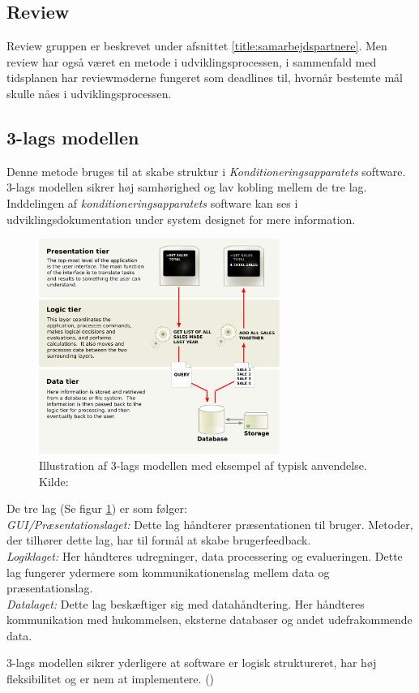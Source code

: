\subsection{Review}
Review gruppen er beskrevet under afsnittet \ref{title:samarbejdspartnere}. Men review har også været en metode i udviklingsprocessen, i sammenfald med tidsplanen har reviewmøderne fungeret som deadlines til, hvornår bestemte mål skulle nåes i udviklingsprocessen. 

\subsection{3-lags modellen}
Denne metode bruges til at skabe struktur i \textit{Konditioneringsapparatets} software. 3-lags modellen sikrer høj samhørighed og lav kobling mellem de tre lag. Inddelingen af \textit{konditioneringsapparatets} software kan ses i udviklingsdokumentation under system designet for mere information. 
\begin{figure}[H]
	\centering
\includegraphics[width = 0.7\textwidth]{billeder/trelagsmodel.png}
\caption{Illustration af 3-lags modellen med eksempel af typisk anvendelse. Kilde: \cite{Billede:2}}\label{fig:3lagsmodel}
\end{figure}

De tre lag (Se figur \ref{fig:3lagsmodel}) er som følger: \\
\textit{GUI/Præsentationslaget:} Dette lag håndterer præsentationen til bruger. Metoder, der tilhører dette lag, har til formål at skabe brugerfeedback. \\
\textit{Logiklaget:} Her håndteres udregninger, data processering og evalueringen. Dette lag fungerer ydermere som kommunikationenslag mellem data og præsentationslag. 
\\ \textit{Datalaget:} Dette lag beskæftiger sig med datahåndtering. Her håndteres kommunikation med hukommelsen, eksterne databaser og andet udefrakommende data.

3-lags modellen sikrer yderligere at software er logisk struktureret, har høj fleksibilitet og er nem at implementere. (\cite{RefWorks:31})
